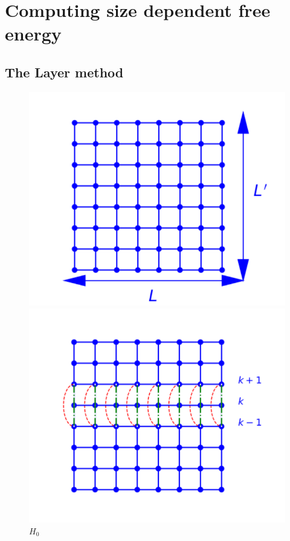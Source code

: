 \section{Computing size dependent free energy}

\subsection{The Layer method}

\begin{figure}
\begin{minipage}[t]{0.32\linewidth}
\includegraphics[width=\linewidth]{numerical/cross-h0.pdf}
\caption*{$H_0$}
\end{minipage}
\begin{minipage}[t]{0.32\linewidth}
\includegraphics[width=\linewidth]{numerical/cross-hlambda.pdf}

\end{minipage}
\end{figure}

